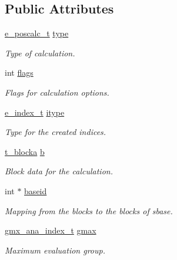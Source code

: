\subsection*{\-Public \-Attributes}
\begin{DoxyCompactItemize}
\item 
\hyperlink{include_2poscalc_8h_abda45ad4bf42febbe957a08c4ee291c2}{e\-\_\-poscalc\-\_\-t} \hyperlink{structgmx__ana__poscalc__t_ad361499da3e273c1f4ef1eed185389e5}{type}
\begin{DoxyCompactList}\small\item\em \-Type of calculation. \end{DoxyCompactList}\item 
int \hyperlink{structgmx__ana__poscalc__t_a2f28c7133614840ed0cc44ae8ef7413e}{flags}
\begin{DoxyCompactList}\small\item\em \-Flags for calculation options. \end{DoxyCompactList}\item 
\hyperlink{include_2indexutil_8h_ad7330829cb93245b9de7ed268cf6ba67}{e\-\_\-index\-\_\-t} \hyperlink{structgmx__ana__poscalc__t_a210bc2a0c9e2fc5d60b020ea2e46e66b}{itype}
\begin{DoxyCompactList}\small\item\em \-Type for the created indices. \end{DoxyCompactList}\item 
\hyperlink{structt__blocka}{t\-\_\-blocka} \hyperlink{structgmx__ana__poscalc__t_a1518e903b1d377405ca5ee6c9251ae3f}{b}
\begin{DoxyCompactList}\small\item\em \-Block data for the calculation. \end{DoxyCompactList}\item 
int $\ast$ \hyperlink{structgmx__ana__poscalc__t_ae07c26738181ffe6a413e57ed6e5bd64}{baseid}
\begin{DoxyCompactList}\small\item\em \-Mapping from the blocks to the blocks of {\ttfamily sbase}. \end{DoxyCompactList}\item 
\hyperlink{structgmx__ana__index__t}{gmx\-\_\-ana\-\_\-index\-\_\-t} \hyperlink{structgmx__ana__poscalc__t_a861c9c269ede19d7a6ce5656a6486cae}{gmax}
\begin{DoxyCompactList}\small\item\em \-Maximum evaluation group. \end{DoxyCompactList}\item 

\end{DoxyCompactItemize}
